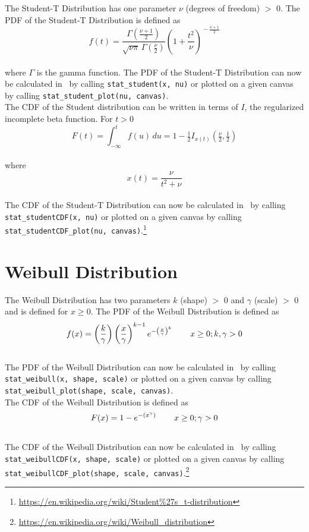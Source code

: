 		The Student-T Distribution has one parameter $\nu$ (degrees of freedom) $>$ 0. The \ac{PDF} of the Student-T Distribution is defined as
		\\[0.3cm]
		$$f(t) = \frac{\Gamma(\frac{\nu+1}{2})} {\sqrt{\nu\pi}\,\Gamma(\frac{\nu}{2})} \left(1+\frac{t^2}{\nu} \right)^{\!-\frac{\nu+1}{2}}$$
		\\[0.3cm]
		where $\Gamma$ is the gamma function. The \ac{PDF} of the Student-T Distribution can now be calculated in \setlx\ by calling \lstinline{stat_student(x, nu)} or plotted on a given canvas by calling \lstinline{stat_student_plot(nu, canvas)}.
		\\[0.3cm]
		The \ac{CDF} of the Student distribution can be written in terms of $I$, the regularized incomplete beta function. For $t > 0$
		\\[0.3cm]
		$$F(t) = \int_{-\infty}^t f(u)\,du = 1 - \tfrac{1}{2} I_{x(t)}\left(\tfrac{\nu}{2}, \tfrac{1}{2}\right)$$
		\\[0.3cm]
		where $$x(t) = \frac{\nu}{{t^2+\nu}}$$
		\\[0.3cm]
		The \ac{CDF} of the Student-T Distribution can now be calculated in \setlx\ by calling \lstinline{stat_studentCDF(x, nu)} or plotted on a given canvas by calling \lstinline{stat_studentCDF_plot(nu, canvas)}.\footnote{\url{https://en.wikipedia.org/wiki/Student\%27s_t-distribution}}
		
	\section{Weibull Distribution}
	
		The Weibull Distribution has two parameters $k$ (shape) $>$ 0 and $\gamma$ (scale) $>$ 0 and is defined for $x \geq 0$. The \ac{PDF} of the Weibull Distribution is defined as
		\\[0.3cm]
		$$f(x) = \left(\frac{k}{\gamma}\right)\left(\frac{x}{\gamma}\right)^{k-1}e^{-\left(\frac{x}{\gamma}\right)^{k}} \hspace{.3in} x \geq 0; k,\gamma > 0\\$$
		\\[0.3cm]
		The \ac{PDF} of the Weibull Distribution can now be calculated in \setlx\ by calling \lstinline{stat_weibull(x, shape, scale)} or plotted on a given canvas by calling \lstinline{stat_weibull_plot(shape, scale, canvas)}.
		\\[0.3cm]
		The \ac{CDF} of the Weibull Distribution is defined as
		\\[0.3cm]
		$$F(x) = 1 - e^{-(x^{\gamma})} \hspace{.3in} x \geq 0; \gamma > 0$$
		\\[0.3cm]
		The \ac{CDF} of the Weibull Distribution can now be calculated in \setlx\ by calling \lstinline{stat_weibullCDF(x, shape, scale)} or plotted on a given canvas by calling \lstinline{stat_weibullCDF_plot(shape, scale, canvas)}.\footnote{\url{https://en.wikipedia.org/wiki/Weibull_distribution}}
		